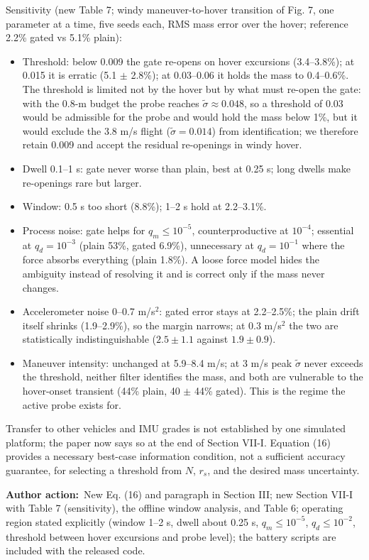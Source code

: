 \documentclass[11pt]{article}
\newcommand{\rlabel}[1]{\par\textbf{#1}\ }
\begin{document}
Sensitivity (new Table 7; windy maneuver-to-hover transition of Fig. 7, one parameter at a time, five seeds each, RMS mass error over the hover; reference 2.2\% gated vs 5.1\% plain):
\begin{itemize}[leftmargin=1.4em]
\item Threshold: below 0.009 the gate re-opens on hover excursions (3.4--3.8\%); at 0.015 it is erratic (5.1 $\pm$ 2.8\%); at 0.03--0.06 it holds the mass to 0.4--0.6\%. The threshold is limited not by the hover but by what must re-open the gate: with the 0.8-m budget the probe reaches $\tilde\sigma \approx 0.048$, so a threshold of 0.03 would be admissible for the probe and would hold the mass below 1\%, but it would exclude the 3.8 m/s flight ($\tilde\sigma = 0.014$) from identification; we therefore retain 0.009 and accept the residual re-openings in windy hover.
\item Dwell 0.1--1 s: gate never worse than plain, best at 0.25 s; long dwells make re-openings rare but larger.
\item Window: 0.5 s too short (8.8\%); 1--2 s hold at 2.2--3.1\%.
\item Process noise: gate helps for $q_m \le 10^{-5}$, counterproductive at $10^{-4}$; essential at $q_d = 10^{-3}$ (plain 53\%, gated 6.9\%), unnecessary at $q_d = 10^{-1}$ where the force absorbs everything (plain 1.8\%). A loose force model hides the ambiguity instead of resolving it and is correct only if the mass never changes.
\item Accelerometer noise 0--0.7 m/s$^2$: gated error stays at 2.2--2.5\%; the plain drift itself shrinks (1.9--2.9\%), so the margin narrows; at 0.3 m/s$^2$ the two are statistically indistinguishable ($2.5\pm1.1$ against $1.9\pm0.9$).
\item Maneuver intensity: unchanged at 5.9--8.4 m/s; at 3 m/s peak $\tilde\sigma$ never exceeds the threshold, neither filter identifies the mass, and both are vulnerable to the hover-onset transient (44\% plain, 40 $\pm$ 44\% gated). This is the regime the active probe exists for.
\end{itemize}
Transfer to other vehicles and IMU grades is not established by one simulated platform; the paper now says so at the end of Section VII-I. Equation (16) provides a necessary best-case information condition, not a sufficient accuracy guarantee, for selecting a threshold from $N$, $r_s$, and the desired mass uncertainty.

\rlabel{Author action:}New Eq. (16) and paragraph in Section III; new Section VII-I with Table 7 (sensitivity), the offline window analysis, and Table 6; operating region stated explicitly (window 1--2 s, dwell about 0.25 s, $q_m \le 10^{-5}$, $q_d \le 10^{-2}$, threshold between hover excursions and probe level); the battery scripts are included with the released code.
\end{document}
